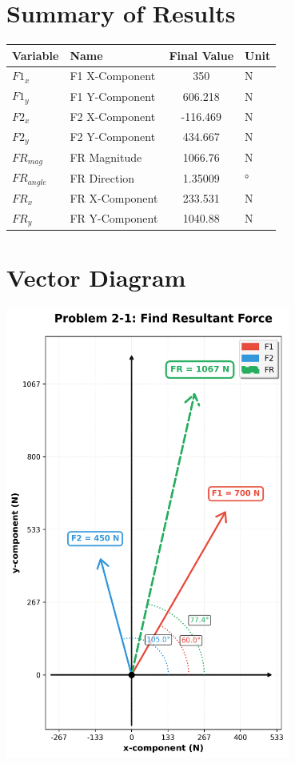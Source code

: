 \documentclass[11pt,a4paper]{article}
\begin{document}
\section{Summary of Results}

\begin{longtable}{llSl}
\toprule
Variable & Name & {Final Value} & Unit \\
\midrule
\endhead
$F1_{x}$ & F1 X-Component & 350 & N \\
$F1_{y}$ & F1 Y-Component & 606.218 & N \\
$F2_{x}$ & F2 X-Component & -116.469 & N \\
$F2_{y}$ & F2 Y-Component & 434.667 & N \\
$FR_{mag}$ & FR Magnitude & 1066.76 & N \\
$FR_{angle}$ & FR Direction & 1.35009 & ° \\
$FR_{x}$ & FR X-Component & 233.531 & N \\
$FR_{y}$ & FR Y-Component & 1040.88 & N \\
\bottomrule
\end{longtable}

\section{Vector Diagram}

\begin{center}
\includegraphics[width=0.7\textwidth]{Problem_2-1_Find_Resultant_Force_diagram.png}
\end{center}
\end{document}
